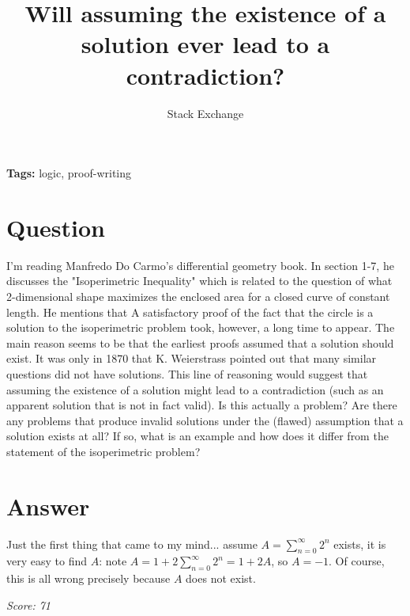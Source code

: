 \documentclass{article}
\title{Will assuming the existence of a solution ever lead to a contradiction?}
\author{Stack Exchange}
\date{}
\begin{document}
\maketitle

\noindent\textbf{Tags:} logic, proof-writing

\section*{Question}
I'm reading Manfredo Do Carmo's differential geometry book. In section 1-7, he discusses the "Isoperimetric Inequality" which is related to the question of what 2-dimensional shape maximizes the enclosed area for a closed curve of constant length. He mentions that A satisfactory proof of the fact that the circle is a solution to the isoperimetric problem took, however, a long time to appear. The main reason seems to be that the earliest proofs assumed that a solution should exist. It was only in 1870 that K. Weierstrass pointed out that many similar questions did not have solutions. This line of reasoning would suggest that assuming the existence of a solution might lead to a contradiction (such as an apparent solution that is not in fact valid). Is this actually a problem? Are there any problems that produce invalid solutions under the (flawed) assumption that a solution exists at all? If so, what is an example and how does it differ from the statement of the isoperimetric problem?

\section*{Answer}
Just the first thing that came to my mind... assume $A=\sum_{n=0}^{\infty}2^n $ exists, it is very easy to find $A $: note $A=1+2\sum_{n=0}^{\infty}2^n =1+2A $, so $A=-1$. Of course, this is all wrong precisely because $A $ does not exist.

\vspace{1em}
\noindent\textit{Score: 71}
\end{document}
